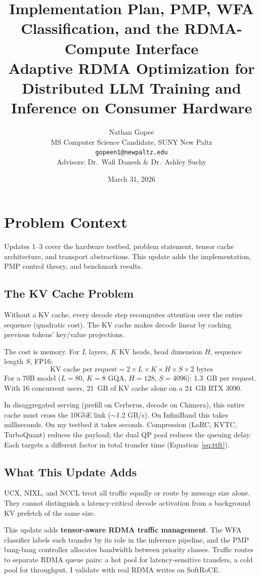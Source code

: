 \documentclass[11pt]{article}
\title{Implementation Plan, PMP, WFA Classification, and the RDMA-Compute Interface\\[4pt]
\large Adaptive RDMA Optimization for Distributed LLM Training and Inference on Consumer Hardware}
\author{Nathan Gopee\\MS Computer Science Candidate, SUNY New Paltz\\\texttt{gopeen1@newpaltz.edu}\\[4pt]Advisors: Dr.\ Wafi Danesh \& Dr.\ Ashley Suchy}
\date{March 31, 2026}
\begin{document}
\maketitle
\tableofcontents
\newpage

\section{Problem Context}

Updates 1--3 cover the hardware testbed, problem statement, tensor cache architecture, and transport abstractions. This update adds the implementation, PMP control theory, and benchmark results.

\subsection{The KV Cache Problem}

Without a KV cache, every decode step recomputes attention over the entire sequence (quadratic cost). The KV cache makes decode linear by caching previous tokens' key/value projections.

The cost is memory. For $L$ layers, $K$ KV heads, head dimension $H$, sequence length $S$, FP16:
\[
\text{KV cache per request} = 2 \times L \times K \times H \times S \times 2 \text{ bytes}
\]
For a 70B model ($L{=}80$, $K{=}8$ GQA, $H{=}128$, $S{=}4096$): 1.3~GB per request. With 16 concurrent users, 21~GB of KV cache alone on a 24~GB RTX 3090.

In disaggregated serving (prefill on Cerberus, decode on Chimera), this entire cache must cross the 10GbE link ($\sim$1.2 GB/s). On InfiniBand this takes milliseconds. On my testbed it takes seconds. Compression (LoRC, KVTC, TurboQuant) reduces the payload; the dual QP pool reduces the queuing delay. Each targets a different factor in total transfer time (Equation~\ref{eq:ttft}).

\subsection{What This Update Adds}

UCX, NIXL, and NCCL treat all traffic equally or route by message size alone. They cannot distinguish a latency-critical decode activation from a background KV prefetch of the same size.

This update adds \textbf{tensor-aware RDMA traffic management}. The WFA classifier labels each transfer by its role in the inference pipeline, and the PMP bang-bang controller allocates bandwidth between priority classes. Traffic routes to separate RDMA queue pairs: a hot pool for latency-sensitive transfers, a cold pool for throughput. I validate with real RDMA writes on SoftRoCE.
\end{document}
